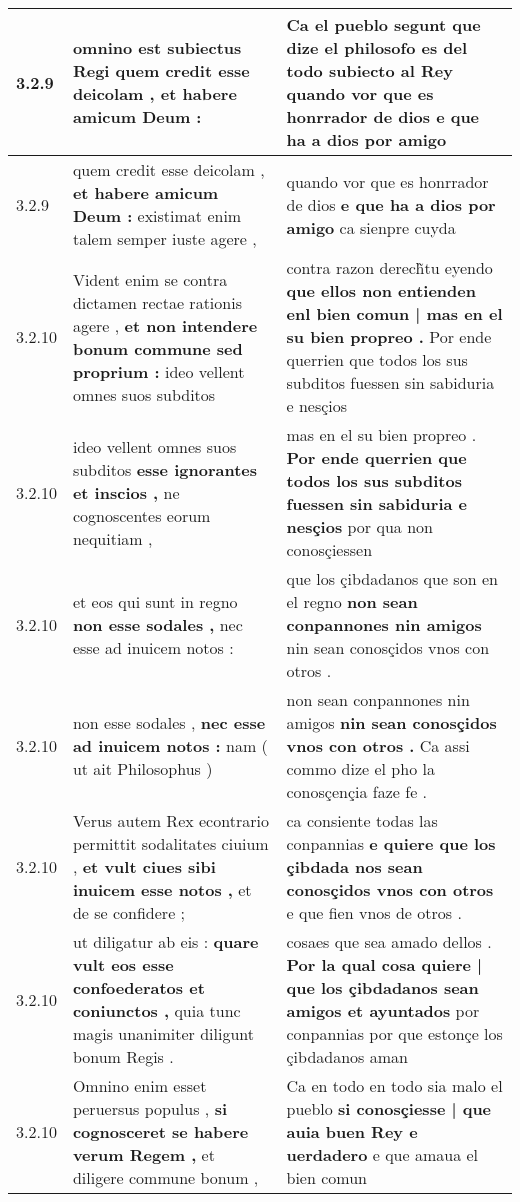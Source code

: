 \begin{tabular}{|p{1cm}|p{6.5cm}|p{6.5cm}|}
3.2.9 & omnino est subiectus Regi \textbf{ quem credit esse deicolam , } et habere amicum Deum : & Ca el pueblo segunt que dize el philosofo es del todo subiecto al Rey \textbf{ quando vor que es honrrador de dios } e que ha a dios por amigo \\\hline
3.2.9 & quem credit esse deicolam , \textbf{ et habere amicum Deum : } existimat enim talem semper iuste agere , & quando vor que es honrrador de dios \textbf{ e que ha a dios por amigo } ca sienpre cuyda \\\hline
3.2.10 & Vident enim se contra dictamen rectae rationis agere , \textbf{ et non intendere bonum commune sed proprium : } ideo vellent omnes suos subditos & contra razon derech̃tu eyendo \textbf{ que ellos non entienden enl bien comun | mas en el su bien propreo . } Por ende querrien que todos los sus subditos fuessen sin sabiduria e nesçios \\\hline
3.2.10 & ideo vellent omnes suos subditos \textbf{ esse ignorantes et inscios , } ne cognoscentes eorum nequitiam , & mas en el su bien propreo . \textbf{ Por ende querrien que todos los sus subditos fuessen sin sabiduria e nesçios } por qua non conosçiessen \\\hline
3.2.10 & et eos qui sunt in regno \textbf{ non esse sodales , } nec esse ad inuicem notos : & que los çibdadanos que son en el regno \textbf{ non sean conpannones nin amigos } nin sean conosçidos vnos con otros . \\\hline
3.2.10 & non esse sodales , \textbf{ nec esse ad inuicem notos : } nam ( ut ait Philosophus ) & non sean conpannones nin amigos \textbf{ nin sean conosçidos vnos con otros . } Ca assi commo dize el pho la conosçençia faze fe . \\\hline
3.2.10 & Verus autem Rex econtrario permittit sodalitates ciuium , \textbf{ et vult ciues sibi inuicem esse notos , } et de se confidere ; & ca consiente todas las conpannias \textbf{ e quiere que los çibdada nos sean conosçidos vnos con otros } e que fien vnos de otros . \\\hline
3.2.10 & ut diligatur ab eis : \textbf{ quare vult eos esse confoederatos et coniunctos , } quia tunc magis unanimiter diligunt bonum Regis . & cosaes que sea amado dellos . \textbf{ Por la qual cosa quiere | que los çibdadanos sean amigos et ayuntados } por conpannias por que estonçe los çibdadanos aman \\\hline
3.2.10 & Omnino enim esset peruersus populus , \textbf{ si cognosceret se habere verum Regem , } et diligere commune bonum , & Ca en todo en todo sia malo el pueblo \textbf{ si conosçiesse | que auia buen Rey e uerdadero } e que amaua el bien comun \\\hline

\end{tabular}
